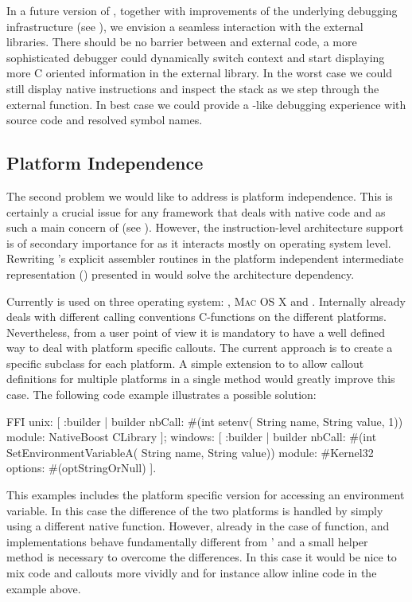 In a future version of \NB, together with improvements of the underlying \B debugging infrastructure (see ), we envision a seamless interaction with the external libraries.
There should be no barrier between \PH and external code, a more sophisticated debugger could dynamically switch context and start displaying more C oriented information in the external library.
In the worst case we could still display native instructions and inspect the stack as we step through the external function.
In best case we could provide a \GDB-like debugging experience with source code and resolved symbol names.

\subsection{Platform Independence}
The second problem we would like to address is platform independence.
This is certainly a crucial issue for any framework that deals with native code and as such a main concern of \B (see ).
However, the instruction-level architecture support is of secondary importance for \NB as it interacts mostly on operating system level.
Rewriting \NB's explicit assembler routines in the platform independent intermediate representation (\VCPU) presented in  would solve the \CPU architecture dependency.

Currently \NB is used on three operating system: \Linux, \textsc{Mac OS X} and \Windows.
Internally \NB already deals with different calling conventions C-functions on the different platforms.
Nevertheless, from a user point of view it is mandatory to have a well defined way to deal with platform specific \FFI callouts.
The current approach is to create a specific subclass for each platform.
A simple extension to \NB to allow callout definitions for multiple platforms in a single method would greatly improve this case.
The following code example illustrates a possible solution:
%
\begin{stcode}[]{}
FFI 
  unix: [ :builder |
    builder 
      nbCall: #(int setenv(
                      String name, String value, 1))
      module: NativeBoost CLibrary ];
  windows: [ :builder |
    builder
      nbCall: #(int SetEnvironmentVariableA(
                      String name, String value))
      module: #Kernel32
      options: #(optStringOrNull) ].
\end{stcode}
%
This examples includes the platform specific version for accessing an environment variable.
In this case the difference of the two platforms is handled by simply using a different native function.
However, already in the case of  function, \Windows and \unix implementations behave fundamentally different from \Windows'  and a small \PH helper method is necessary to overcome the differences.
In this case it would be nice to mix \PH code and \FFI callouts more vividly and for instance allow inline \PH code in the example above.

